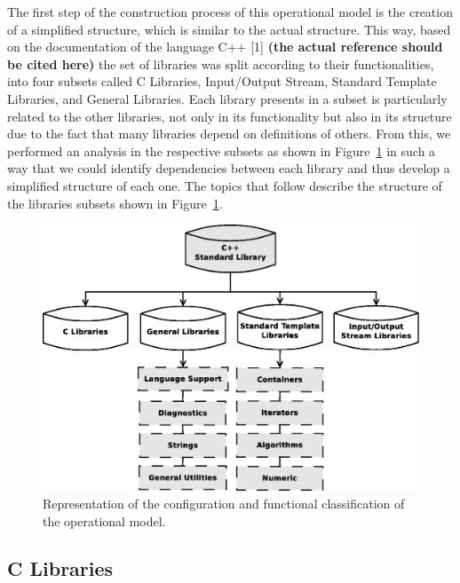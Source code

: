 \documentclass[a4paper]{llncs}
\begin{document}
The first step of the construction process of this operational model is the creation of a simplified structure,
which is similar to the actual structure. This way, based on the documentation of the language C++ [1] 
\textbf{(the actual reference should be cited here)} the set of libraries was split according to their 
functionalities, into four subsets called C Libraries, Input/Output Stream, Standard Template Libraries, 
and General Libraries. Each library presents in a subset is particularly related to the other libraries, 
not only in its functionality but also in its structure due to the fact that many libraries depend on 
definitions of others. From this, we performed an analysis in the respective subsets as shown in 
Figure~\ref{figure:cpp-diagram} in such a way that we could identify dependencies between each library 
and thus develop a simplified structure of each one. The topics that follow describe the structure 
of the libraries subsets shown in Figure~\ref{figure:cpp-diagram}.
%
\begin{figure}[ht]
\centering
\includegraphics[scale=0.28]{figures/diagramascpp}
\caption{Representation of the configuration and functional classification of the operational model.}
\label{figure:cpp-diagram}
\end{figure}

\subsection{C Libraries}
\end{document}
